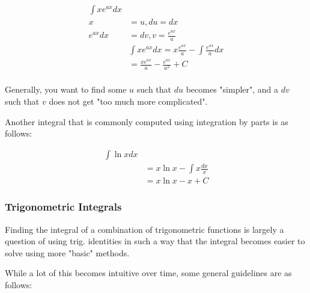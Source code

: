 \documentclass[12pt]{article}
\begin{document}
\begin{equation}
    \begin{split}
        \int x e^{ax} dx&\\
        x &= u, du = dx\\
    e^{ax} dx &= dv, v = \frac{e^{ax}}{a}\\
    &\int x e^{ax} dx = x \frac{e^{ax}}{a} - \int \frac{e^{ax}}{a} dx\\
    &= \frac{xe^{ax}}{a} - \frac{e^{ax}}{a^2}+C\\
    \end{split}
\end{equation}

Generally, you want to find some $u$ such that $du$ becomes "simpler", and a $dv$ such that $v$ does not get "too much more complicated".

Another integral that is commonly computed using integration by parts is as follows:

\begin{equation}
    \begin{split}
        \int \ln x dx&\\
        &= x \ln x - \int x \frac{dx}{x}\\
        &= x \ln x - x + C
    \end{split}
\end{equation}

\subsubsection{Trigonometric Integrals}

Finding the integral of a combination of trigonometric functions is largely a question of using trig. identities in such a way that the integral becomes easier to solve using more "basic" methods. 

While a lot of this becomes intuitive over time, some general guidelines are as follows:
\end{document}
